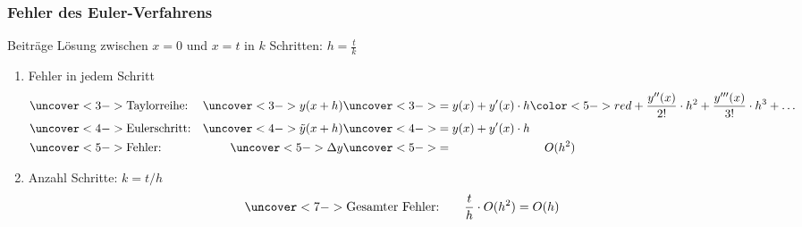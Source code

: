 %
%
%
\begin{frame}
\frametitle{Fehler des Euler-Verfahrens}
\begin{block}{Beiträge}
Lösung zwischen $x=0$ und $x=t$ in $k$ Schritten: $h=\frac{t}{k}$
\begin{enumerate}
\item<2->
Fehler in jedem Schritt 
\vspace{-10pt}
\begin{align*}
&\uncover<3->{\text{Taylorreihe:}}&
\uncover<3->{y(x+h)}
&\uncover<3->{= 
y(x) + y'(x)\cdot h {\color<5->{red}\mathstrut + \frac{y''(x)}{2!}\cdot h^2 +\frac{y'''(x)}{3!}\cdot h^3+\dots}}
\\
&\uncover<4->{\text{Eulerschritt:}}&
\uncover<4->{\tilde{y}(x+h)}
&\uncover<4->{=
y(x) + y'(x)\cdot h}
\\
&\uncover<5->{\text{Fehler:}}&
\uncover<5->{\Delta y}
&\uncover<5->{=
\phantom{ y(x) + y'(x)\cdot h+\mathstrut}
O(h^2)}
\end{align*}
\vspace{-15pt}
\item<6->
Anzahl Schritte: $k=t/h$
\vspace{-5pt}
\[
\uncover<7->{
\text{Gesamter Fehler:}\qquad \frac{t}{h}\cdot O(h^2) = O(h)
}
\]
\end{enumerate}
\end{block}
\vspace{-25pt}

\end{frame}
